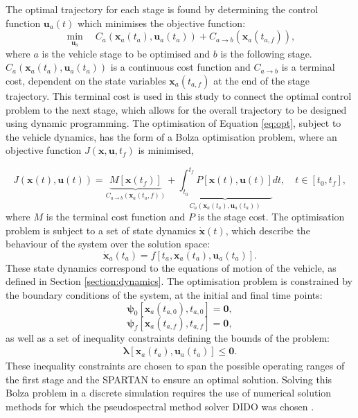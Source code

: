 \documentclass[journal]{new-aiaa}
\begin{document}
 The optimal trajectory for each stage is found by determining the control function $\textbf{u}_a(t)$ which minimises the objective function:
\begin{equation} \label{eq:opt}
\min\limits_{\textbf{u}_a} \quad C_a(\textbf{x}_a(t_a),\textbf{u}_a(t_a)) + C_{a\rightarrow  b}(\textbf{x}_a(t_{a,f})),
\end{equation}
where $a$ is the vehicle stage to be optimised and $b$ is the following stage. $ C_a(\textbf{x}_a(t_a),\textbf{u}_a(t_a))$ is a continuous cost function and $C_{{a\rightarrow b}}$ is a terminal cost, dependent on the state variables $\textbf{x}_a(t_{a,f})$ at the end of the stage trajectory. This terminal cost is used in this study to connect the optimal control problem to the next stage, which allows for the overall trajectory to be designed using dynamic programming.
The optimisation of Equation \ref{eq:opt}, subject to the vehicle dynamics, has the form of a Bolza optimisation problem, where an objective function $J(\textbf{x},\textbf{u},t_f)$ is minimised,

\begin{equation} \label{eq:cost}
J(\textbf{x}(t),\textbf{u}(t)) = \underbrace{M[\textbf{x}(t_f)]}_{C_{a\rightarrow  b}(\textbf{x}_a(t_a,{f}))} +   \underbrace{\int_{t_0}^{t_f} P[\textbf{x}(t),\textbf{u}(t)]}_{ C_a(\textbf{x}_a(t_a),\textbf{u}_a(t_a))} dt, \quad t \in [t_0,t_f],
\end{equation}
where $M$ is the terminal cost function and $P$ is the stage cost. The optimisation problem is subject to a set of state dynamics $\dot{\textbf{x}}(t)$, which describe the behaviour of the system over the solution space: 
\begin{equation} \label{eq:state}
\dot{\textbf{x}}_a(t_a) = f[t_a,\textbf{x}_a(t_a),\textbf{u}_a(t_a)].
\end{equation}
These state dynamics correspond to the equations of motion of the vehicle, as defined in Section \ref{section:dynamics}.
The optimisation problem is constrained by the boundary conditions of the system, at the initial and final time points:
\begin{equation}
\bm{\psi}_0[\textbf{x}_a(t_{a,0}), t_{a,0}] = \textbf{0},
\end{equation}
\begin{equation} \label{eq:2}
\bm{\psi}_f[\textbf{x}_a(t_{a,f}), t_{a,f}] = \textbf{0},
\end{equation}
as well as a set of inequality constraints defining the bounds of the problem:
\begin{eqnarray}
\bm{\lambda}[\textbf{x}_a(t_a),\textbf{u}_a(t_a)] \leq \textbf{0}.
\end{eqnarray}
 These inequality constraints are chosen to span the possible operating ranges of the first stage and the SPARTAN to ensure an optimal solution. 
 Solving this Bolza problem in a discrete simulation requires the use of numerical solution methods for which the pseudospectral method solver DIDO was chosen \cite{Ross}.
 
\end{document}
